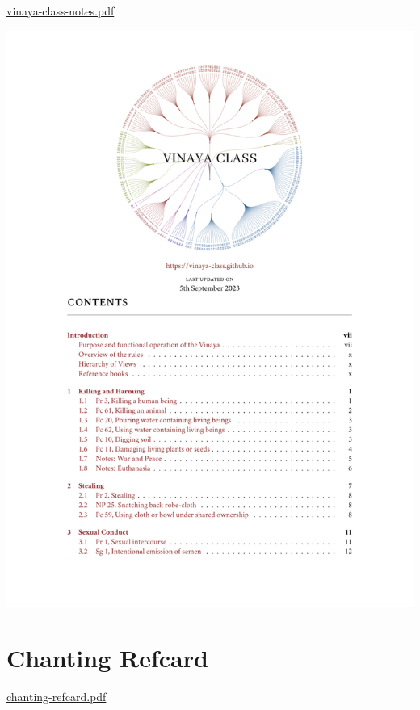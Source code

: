 \href{./includes/docs/vinaya-class-notes.pdf}{vinaya-class-notes.pdf}

\href{./includes/docs/vinaya-class-notes.pdf}{\includegraphics{./includes/docs/vinaya-class-notes-thumb.png}}

\section{Chanting Refcard}

\href{./includes/docs/chanting-refcard.pdf}{chanting-refcard.pdf}

